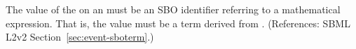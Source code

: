 The value of the   on an \Event must be an SBO
identifier referring to a mathematical expression.  That is, the value must
be a term derived from \sboevent.  (References: SBML L2v2
Section~\ref{sec:event-sboterm}.)
